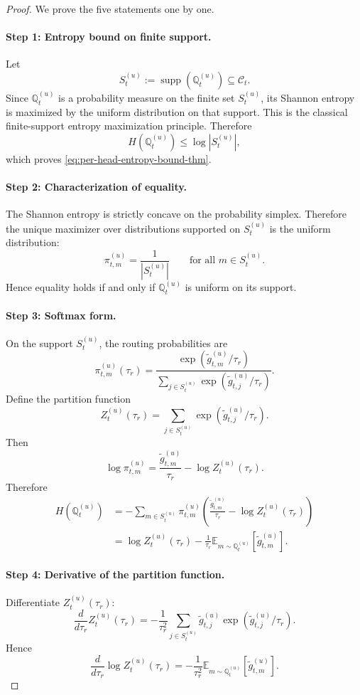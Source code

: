 \documentclass{article}
\theoremstyle{plain}
\theoremstyle{definition}
\theoremstyle{remark}
\begin{document}
\begin{proof}
We prove the five statements one by one.

\paragraph{Step 1: Entropy bound on finite support.}
Let
\[
S_{t}^{(u)} := \operatorname{supp}\!\left(\mathbb{Q}^{(u)}_{t}\right)
\subseteq \mathcal{C}_{t}.
\]
Since $\mathbb{Q}^{(u)}_{t}$ is a probability measure on the finite set $S_{t}^{(u)}$, its Shannon entropy is maximized by the uniform distribution on that support. This is the classical finite-support entropy maximization principle. Therefore
\[
H\!\left(\mathbb{Q}^{(u)}_{t}\right)\le \log |S_{t}^{(u)}|,
\]
which proves \eqref{eq:per-head-entropy-bound-thm}.

\paragraph{Step 2: Characterization of equality.}
The Shannon entropy is strictly concave on the probability simplex. Therefore the unique maximizer over distributions supported on $S_{t}^{(u)}$ is the uniform distribution:
\[
\pi^{(u)}_{t,m} = \frac{1}{|S_{t}^{(u)}|} \qquad \text{for all } m\in S_{t}^{(u)}.
\]
Hence equality holds if and only if $\mathbb{Q}^{(u)}_{t}$ is uniform on its support.

\paragraph{Step 3: Softmax form.}
On the support $S_{t}^{(u)}$, the routing probabilities are
\[
\pi^{(u)}_{t,m}(\tau_r)
=
\frac{\exp(\tilde g^{(u)}_{t,m}/\tau_r)}
{\sum_{j\in S_{t}^{(u)}} \exp(\tilde g^{(u)}_{t,j}/\tau_r)}.
\]
Define the partition function
\[
Z_{t}^{(u)}(\tau_r)
=
\sum_{j\in S_{t}^{(u)}} \exp(\tilde g^{(u)}_{t,j}/\tau_r).
\]
Then
\[
\log \pi^{(u)}_{t,m}
=
\frac{\tilde g^{(u)}_{t,m}}{\tau_r}
-
\log Z_{t}^{(u)}(\tau_r).
\]
Therefore
\begin{align}
 H\!\left(\mathbb{Q}^{(u)}_{t}\right)
&=
-\sum_{m\in S_{t}^{(u)}} \pi^{(u)}_{t,m}
\left(
\frac{\tilde g^{(u)}_{t,m}}{\tau_r}
-
\log Z_{t}^{(u)}(\tau_r)
\right)
\\
&= 
\log Z_{t}^{(u)}(\tau_r)
-
\frac{1}{\tau_r}
\mathbb E_{m\sim \mathbb Q^{(u)}_{t}}[\tilde g^{(u)}_{t,m}].
\label{eq:entropy-partition-form}
\end{align}

\paragraph{Step 4: Derivative of the partition function.}
Differentiate $Z_{t}^{(u)}(\tau_r)$:
\[
\frac{d}{d\tau_r} Z_{t}^{(u)}(\tau_r)
=
-\frac{1}{\tau_r^2}
\sum_{j\in S_{t}^{(u)}} \tilde g^{(u)}_{t,j}
\exp(\tilde g^{(u)}_{t,j}/\tau_r).
\]
Hence
\[
\frac{d}{d\tau_r}\log Z_{t}^{(u)}(\tau_r)
=
-\frac{1}{\tau_r^2}
\mathbb E_{m\sim \mathbb Q^{(u)}_{t}}[\tilde g^{(u)}_{t,m}].
\]


\end{proof}
\end{document}
